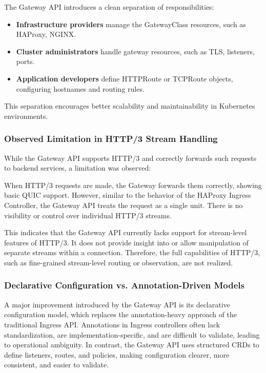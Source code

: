The Gateway API introduces a clean separation of responsibilities:
\begin{itemize}
  \item \textbf{Infrastructure providers} manage the GatewayClass resources, such as HAProxy, NGINX.
  \item \textbf{Cluster administrators} handle gateway resources, such as TLS, listeners, ports.
  \item \textbf{Application developers} define HTTPRoute or TCPRoute objects, configuring hostnames and routing rules.
\end{itemize}

This separation encourages better scalability and maintainability in Kubernetes environments.

\subsubsection{Observed Limitation in HTTP/3 Stream Handling}

While the Gateway API supports HTTP/3 and correctly forwards such requests to backend services, a limitation was observed:

When HTTP/3 requests are made, the Gateway forwards them correctly, showing basic QUIC support. However, similar to the behavior of the HAProxy Ingress Controller, the Gateway API treats the request as a single unit. There is no visibility or control over individual HTTP/3 streams.

This indicates that the Gateway API currently lacks support for stream-level features of HTTP/3. It does not provide insight into or allow manipulation of separate streams within a connection. Therefore, the full capabilities of HTTP/3, such as fine-grained stream-level routing or observation, are not realized.

\subsubsection{Declarative Configuration vs. Annotation-Driven Models}
A major improvement introduced by the Gateway API is its declarative configuration model, which replaces the annotation-heavy approach of the traditional Ingress API. Annotations in Ingress controllers often lack standardization, are implementation-specific, and are difficult to validate, leading to operational ambiguity. In contrast, the Gateway API uses structured CRDs to define listeners, routes, and policies, making configuration clearer, more consistent, and easier to validate.

